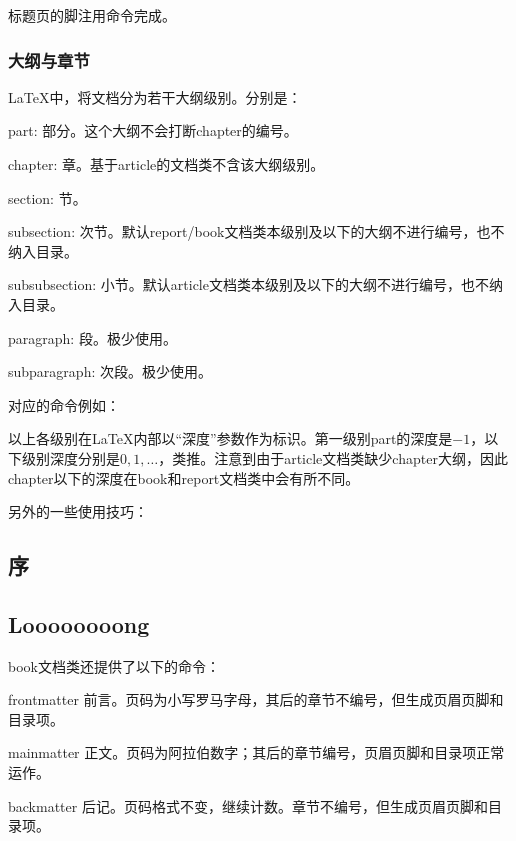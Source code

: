 {标题页的脚注用\latexline{\\thanks}命令完成。

\subsection{大纲与章节}
\LaTeX 中，将文档分为若干大纲级别。分别是：
\begin{para}
\item[\char92{}part:] 部分。这个大纲不会打断chapter的编号。
\item[\char92{}chapter:] 章。基于article的文档类不含该大纲级别。
\item[\char92{}section:] 节。
\item[\char92{}subsection:] 次节。默认report/book文档类本级别及以下的大纲不进行编号，也不纳入目录。
\item[\char92{}subsubsection:] 小节。默认article文档类本级别及以下的大纲不进行编号，也不纳入目录。
\item[\char92{}paragraph:] 段。极少使用。
\item[\char92{}subparagraph:] 次段。极少使用。
\end{para}

对应的命令例如：

以上各级别在\LaTeX 内部以“深度”参数作为标识。第一级别part的深度是$-1$，以下级别深度分别是$0,1,\ldots$，类推。注意到由于article文档类缺少chapter大纲，因此chapter以下的深度在book和report文档类中会有所不同。\dpar

另外的一些使用技巧：
\begin{latex}{}
\setcounter{tocdepth}{2}
\chapter*{序}
\section[Short]{Loooooooong}
\renewcommand{\chaptername}{CHAPTER}
\end{latex}

book文档类还提供了以下的命令：
\begin{para}
\item[\char92 frontmatter] 前言。页码为小写罗马字母，其后的章节不编号，但生成页眉页脚和目录项。
\item[\char92 mainmatter] 正文。页码为阿拉伯数字；其后的章节编号，页眉页脚和目录项正常运作。
\item[\char92 backmatter] 后记。页码格式不变，继续计数。章节不编号，但生成页眉页脚和目录项。
\end{para}

}
